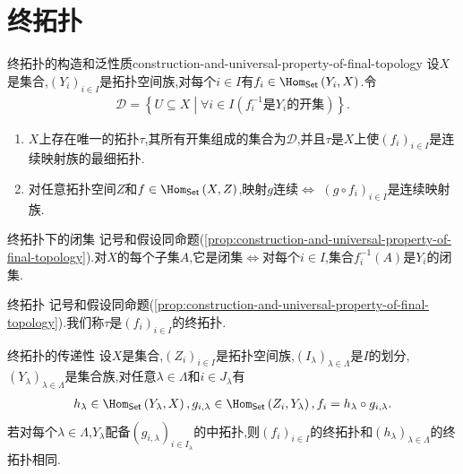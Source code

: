 \section{终拓扑}

\begin{proposition}{终拓扑的构造和泛性质}{construction-and-universal-property-of-final-topology}
	设$X$是集合,$\left(Y_{i}\right)_{i\in I}$是拓扑空间族,对每个$i\in I$有$f_{i}\in\Hom_{\mathsf{Set}}\left(Y_{i},X\right)$.令
	\begin{align*}
		\mathcal{D}=\left\{U\subseteq X\middle|\forall i\in I\left(f_{i}^{-1}\text{是}Y_{i}\text{的开集}\right)\right\}.
	\end{align*}
	\begin{enumerate}
		\item $X$上存在唯一的拓扑$\tau$,其所有开集组成的集合为$\mathcal{D}$,并且$\tau$是$X$上使$\left(f_{i}\right)_{i\in I}$是连续映射族的最细拓扑.
		\item 对任意拓扑空间$Z$和$f\in\Hom_{\mathsf{Set}}\left(X,Z\right)$,映射$g$连续$\iff$ $\left(g\circ f_{i}\right)_{i\in I}$是连续映射族.
	\end{enumerate}
\end{proposition}

\begin{proposition}{终拓扑下的闭集}{}
	记号和假设同命题(\ref{prop:construction-and-universal-property-of-final-topology}).对$X$的每个子集$A$,它是闭集$\iff$对每个$i\in I$,集合$f_{i}^{-1}\left(A\right)$是$Y_{i}$的闭集.
\end{proposition}

\begin{definition}{终拓扑}{}
	记号和假设同命题(\ref{prop:construction-and-universal-property-of-final-topology}).我们称$\tau$是$\left(f_{i}\right)_{i\in I}$的终拓扑.
\end{definition}

\begin{proposition}{终拓扑的传递性}{}
	设$X$是集合,$\left(Z_{i}\right)_{i\in I}$是拓扑空间族,$\left(I_{\lambda}\right)_{\lambda\in\Lambda}$是$I$的划分,$\left(Y_{\lambda}\right)_{\lambda\in\Lambda}$是集合族,对任意$\lambda\in\Lambda$和$i\in J_{\lambda}$有
	\begin{align*}
		h_{\lambda}\in\Hom_{\mathsf{Set}}\left(Y_{\lambda},X\right),g_{i,\lambda}\in\Hom_{\mathsf{Set}}\left(Z_{i},Y_{\lambda}\right),f_{i}=h_{\lambda}\circ g_{i,\lambda}.
	\end{align*}
	若对每个$\lambda\in\Lambda$,$Y_{\lambda}$配备$\left(g_{i,\lambda}\right)_{i\in I_{\lambda}}$的中拓扑,则$\left(f_{i}\right)_{i\in I}$的终拓扑和$\left(h_{\lambda}\right)_{\lambda\in\Lambda}$的终拓扑相同.
\end{proposition}

